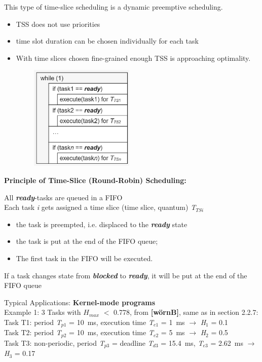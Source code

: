 This type of time-slice scheduling is a dynamic preemptive scheduling. 

\begin{itemize}
	\item TSS does not use priorities
	\item time slot duration can be chosen individually for each task
	\item With time slices chosen fine-grained enough TSS is approaching optimality.
\end{itemize}

	\begin{figure}[h]
    \centering
    \includegraphics[width=6cm, height=5cm]{Images/image90.png}
    \label{fig:Fig }
    \end{figure}
\newpage
\textbf{Principle of Time-Slice (Round-Robin) Scheduling: }

\begin{tcolorbox}[colback=blue!5!white,colframe=blue!75!black]
  All \textbf{\textit{ready}}-tasks are queued in a FIFO \\
  Each task \textit{i} gets assigned a time slice (time slice, quantum) \textit{T${}_{TSi}$}
  \begin{itemize}
		\item  the task is preempted, i.e. displaced to the \textbf{\textit{ready}} state
		\item  the task is put at the end of the FIFO queue;
		\item  The first task in the FIFO will be executed.
	\end{itemize}
  
  If a task changes state from \textbf{\textit{blocked}} to \textbf{\textit{ready}}, it will be put at the end of the FIFO queue
\end{tcolorbox}

Typical Applications: \textbf{Kernel-mode programs} \\ 

Example 1: 3 Tasks with $H_{max}$ $<$ 0.778, from \textbf{[wörnB]}, same as in section 2.2.7:\\
Task T1: period \textit{T}${}_{p1}$ = 10~ms, execution time \textit{T}${}_{e1}$ = 1~ms $\rightarrow$ \textit{H}${}_{1}$ = 0.1\\
Task T2: period \textit{T}${}_{p2}$ = 10~ms, execution time\textit{ T}${}_{e2}$ = 5~ms $\rightarrow$ \textit{H}${}_{2}$ = 0.5\\
Task T3: non-periodic, period \textit{T}${}_{p3}$ = deadline \textit{T}${}_{d3}$ = 15.4~ms, \textit{T}${}_{e3}$ = 2.62~ms $\rightarrow$ \textit{H}${}_{3}$ = 0.17\\


